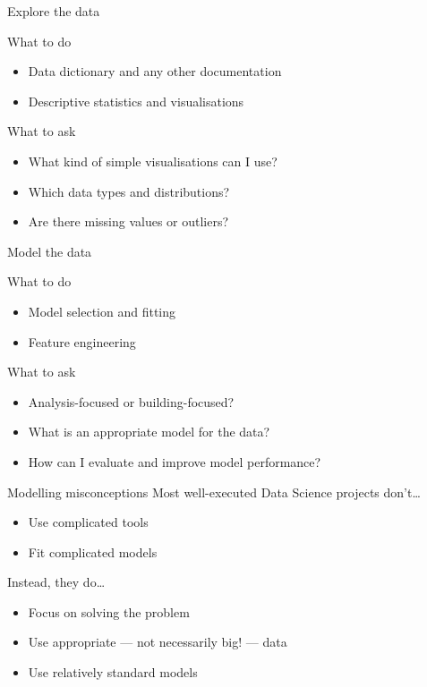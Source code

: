 \begin{frame}[t]{Explore the data}
    \begin{block}{What to do}
        \begin{itemize}
            \item Data dictionary and any other documentation
            \item Descriptive statistics and visualisations
        \end{itemize}
    \end{block}
    \vfill\pause
    \begin{block}{What to ask}
        \begin{itemize}
            \item What kind of simple visualisations can I use?
            \item Which data types and distributions?
            \item Are there missing values or outliers?
        \end{itemize}
    \end{block}
\end{frame}

\begin{frame}[t]{Model the data}
    \begin{block}{What to do}
        \begin{itemize}
            \item Model selection and fitting
            \item Feature engineering
        \end{itemize}
    \end{block}
    \vfill\pause
    \begin{block}{What to ask}
        \begin{itemize}
            \item Analysis\hyp{}focused or building\hyp{}focused?
            \item What is an appropriate model for the data?
            \item How can I evaluate and improve model performance?
        \end{itemize}
    \end{block}
\end{frame}

\begin{frame}{Modelling misconceptions}
    Most well\hyp{}executed Data Science projects don't\ldots
    \begin{itemize}
        \item Use complicated tools
        \item Fit complicated models
    \end{itemize}
    \vfill\pause
    Instead, they do\ldots
    \begin{itemize}
        \item Focus on solving the problem
        \item Use appropriate --- not necessarily big! --- data
        \item Use relatively standard models
    \end{itemize}
\end{frame}

